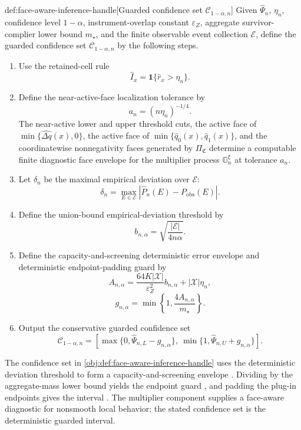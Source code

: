 \begin{algorithmv}{def:face-aware-inference-handle}[Guarded confidence set \(\mathcal C_{1-\alpha,n}\)]
Given \(\widehat\Psi_n\), \(\eta_n\), confidence level \(1-\alpha\), instrument-overlap constant \(\varepsilon_Z\), aggregate survivor-complier lower bound \(m_{\star}\), and the finite observable event collection \(\mathcal E\), define the guarded confidence set \(\mathcal C_{1-\alpha,n}\) by the following steps.
\begin{enumerate}
\item Use the retained-cell rule
\[
\widehat I_x=\mathbf 1\{\widehat r_x>\eta_n\}.
\]

\item Define the near-active-face localization tolerance by
\[
a_n=(n\eta_n)^{-1/4}.
\]
The near-active lower and upper threshold cuts, the active face of \(\min\{\widehat{\Delta q}(x),0\}\), the active face of \(\min\{\widehat q_0(x),\widehat q_1(x)\}\), and the coordinatewise nonnegativity faces generated by \(\Pi_{\mathfrak C}\) determine a computable finite diagnostic face envelope for the multiplier process \(\mathbb G_n^\xi\) at tolerance \(a_n\).

\item Let \(\delta_n\) be the maximal empirical deviation over \(\mathcal E\):
\[
\delta_n=\max_{E\in\mathcal E}\left|\widehat P_n(E)-P_{\mathrm{obs}}(E)\right|.
\]

\item Define the union-bound empirical-deviation threshold by
\[
b_{n,\alpha}=\sqrt{\frac{|\mathcal E|}{4n\alpha}}.
\]

\item Define the capacity-and-screening deterministic error envelope and deterministic endpoint-padding guard by
\[
A_{n,\alpha}
=
\frac{64K|\mathcal X|}{\varepsilon_Z^2}b_{n,\alpha}
+
|\mathcal X|\eta_n,
\]
\[
g_{n,\alpha}
=
\min\left\{1,\frac{4A_{n,\alpha}}{m_{\star}}\right\}.
\]

\item Output the conservative guarded confidence set
\[
\mathcal C_{1-\alpha,n}
=
\left[
\max\{0,\widehat\Psi_{n,L}-g_{n,\alpha}\},\
\min\{1,\widehat\Psi_{n,U}+g_{n,\alpha}\}
\right].
\]
\end{enumerate}
\end{algorithmv}

The confidence set in \cref{obj:def:face-aware-inference-handle} uses the deterministic deviation threshold  to form a capacity-and-screening envelope .  Dividing by the aggregate-mass lower bound yields the endpoint guard , and padding the plug-in endpoints gives the interval .  The multiplier component supplies a face-aware diagnostic for nonsmooth local behavior; the stated confidence set is the deterministic guarded interval.

